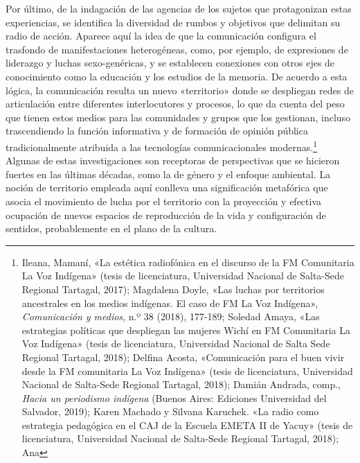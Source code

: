 \documentclass{tufte-handout}
\begin{document}
Por último, de la indagación de las agencias de los sujetos que
protagonizan estas experiencias, se identifica la diversidad de rumbos y
objetivos que delimitan su radio de acción. Aparece aquí la idea de que
la comunicación configura el trasfondo de manifestaciones heterogéneas,
como, por ejemplo, de expresiones de liderazgo y luchas sexo-genéricas,
y se establecen conexiones con otros ejes de conocimiento como la
educación y los estudios de la memoria. De acuerdo a esta lógica, la
comunicación resulta un nuevo «territorio» donde se despliegan redes de
articulación entre diferentes interlocutores y procesos, lo que da
cuenta del peso que tienen estos medios para las comunidades y grupos
que los gestionan, incluso trascendiendo la función informativa y de
formación de opinión pública tradicionalmente atribuida a las
tecnologías comunicacionales modernas.\footnote{Ileana, Mamaní, «La
  estética radiofónica en el discurso de la FM Comunitaria La Voz
  Indígena» (tesis de licenciatura, Universidad Nacional de Salta-Sede
  Regional Tartagal, 2017); Magdalena Doyle, «Las luchas por territorios
  ancestrales en los medios indígenas. El caso de FM La Voz Indígena»,
  \emph{Comunicación y medios}, n.º 38 (2018), 177-189; Soledad Amaya,
  «Las estrategias políticas que despliegan las mujeres Wichí en FM
  Comunitaria La Voz Indígena» (tesis de licenciatura, Universidad
  Nacional de Salta Sede Regional Tartagal, 2018); Delfina Acosta,
  «Comunicación para el buen vivir desde la FM comunitaria La Voz
  Indígena» (tesis de licenciatura, Universidad Nacional de Salta-Sede
  Regional Tartagal, 2018); Damián Andrada, comp., \emph{Hacia un
  periodismo indígena} (Buenos Aires: Ediciones Universidad del
  Salvador, 2019); Karen Machado y Silvana Karuchek. «La radio como
  estrategia pedagógica en el CAJ de la Escuela EMETA II de Yacuy»
  (tesis de licenciatura, Universidad Nacional de Salta-Sede Regional
  Tartagal, 2018); Ana}
Algunas de estas investigaciones son receptoras de perspectivas que se
hicieron fuertes en las últimas décadas, como la de género y el enfoque
ambiental. La noción de territorio empleada aquí conlleva una
significación metafórica que asocia el movimiento de lucha por el
territorio con la proyección y efectiva ocupación de nuevos espacios de
reproducción de la vida y configuración de sentidos, probablemente en el
plano de la cultura.
\end{document}

